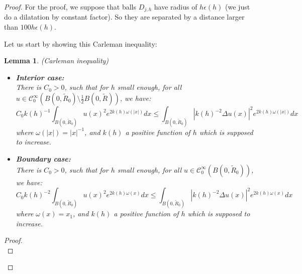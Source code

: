 \documentclass[leqno,11pt,letterpaper, english]{amsart}
\theoremstyle{plain}
\newtheorem{lem}[prop]{Lemma}
\theoremstyle{definition}
\numberwithin{equation}{section}
\def\R{\mathbb R}
\begin{document}
	\begin{proof}
		For the proof, we suppose that balls $D_{j,h}$ have radius of $h\epsilon(h)$ (we just do a dilatation by constant factor). So they are separated by a distance larger than $100h\epsilon(h)$. 
		
		Let us start by showing this Carleman inequality:
		
		\begin{lem}(Carleman inequality)\\
			\label{lem: Carleman classique}
			\begin{itemize}
				\item \textbf{Interior case:}\\
				There is $C_0>0$, such that for $h$ small enough, for all $u \in \mathcal{C}_0^\infty(B(0,\tilde{R}_0)\setminus \frac{1}{2}B(0,\tilde{R}))$, we have:
				\begin{equation}
					C_0 k(h)^{-1} \int_{B(0,\tilde{R}_0)} u(x)^2 e^{2k(h)\omega(|x|)}dx\leq \int_{B(0,\tilde{R}_0)} |k(h)^{-2}\Delta u(x)|^2 e^{2k(h)\omega(|x|)}dx
				\end{equation}
				where $\omega(|x|)=|x|^{-1}$, and $k(h)$ a positive function of $h$ which is supposed to increase.
				\hfill\\
				\item \textbf{Boundary case:}\\
				There is $C_0>0$, such that for $h$ small enough, for all $u \in \mathcal{C}_0^\infty(B(0,\tilde{R}_0))$, we have:
				\begin{equation}
					C_0 k(h)^{-2}\int_{B(0,\tilde{R}_0)} u(x)^2 e^{2k(h)\omega(x)}dx\leq  \int_{B(0,\tilde{R}_0)} |k(h)^{-2}\Delta u(x)|^2 e^{2k(h)\omega(x)}dx
				\end{equation}
				where $\omega(x)=x_1$, and $k(h)$ a positive function of $h$ which is supposed to increase.
			\end{itemize}
		\end{lem}
		
		\begin{proof}
			\hfill\\

\end{proof}
\end{proof}
\end{document}

